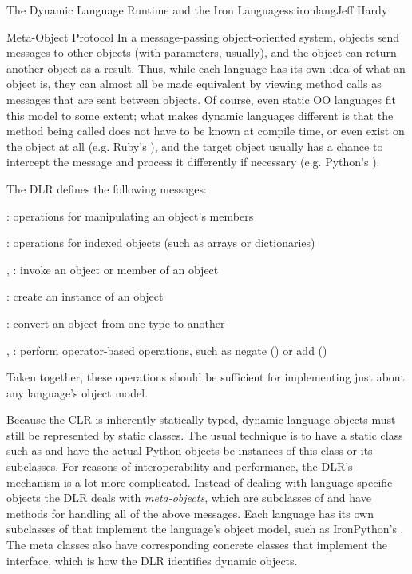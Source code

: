 \begin{aosachapter}{The Dynamic Language Runtime and the Iron Languages}{s:ironlang}{Jeff Hardy}
\begin{aosasect1}{Meta-Object Protocol}
In a message-passing object-oriented system, objects send messages to other objects (with parameters, usually), and the object can return another object as a result. Thus, while each language has its own idea of what an object is, they can almost all be made equivalent by viewing method calls as messages that are sent between objects. Of course, even static OO languages fit this model to some extent; what makes dynamic languages different is that the method being called does not have to be known at compile time, or even exist on the object at all (e.g. Ruby's ), and the target object usually has a chance to intercept the message and process it differently if necessary (e.g. Python's ).

The DLR defines the following messages:

\begin{aosaitemize}

\item {}: operations for manipulating an object's members

\item {}: operations for indexed objects (such as arrays or dictionaries)

\item {}, : invoke an object or member of an object

\item {}: create an instance of an object

\item {}: convert an object from one type to another

\item {}, : perform operator-based operations, such as negate (\code{!}) or add (\code{+})

\end{aosaitemize}

Taken together, these operations should be sufficient for implementing just about any language's object model.

Because the CLR is inherently statically-typed, dynamic language objects must still be represented by static classes. The usual technique is to have a static class such as  and have the actual Python objects be instances of this class or its subclasses. For reasons of interoperability and performance, the DLR's mechanism is a lot more complicated. Instead of dealing with language-specific objects the DLR deals with \emph{meta-objects}, which are subclasses of  and have methods for handling all of the above messages. Each language has its own subclasses of  that implement the language's object model, such as IronPython's . The meta classes also have corresponding concrete classes that implement the  interface, which is how the DLR identifies dynamic objects. 


\end{aosasect1}
\end{aosachapter}
